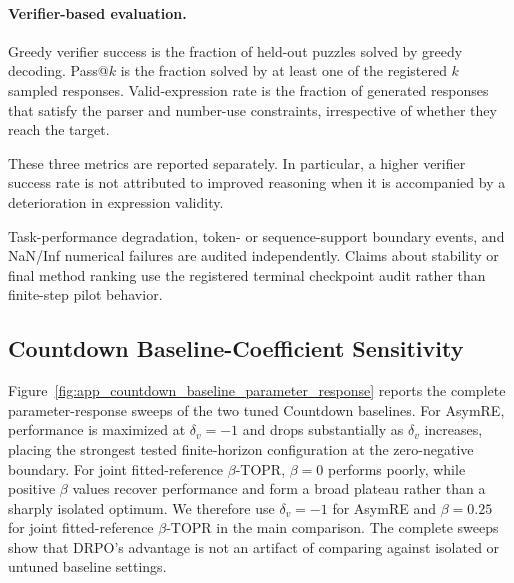 \documentclass{article}
\theoremstyle{plain}
\theoremstyle{definition}
\theoremstyle{remark}
\begin{document}
\paragraph{Verifier-based evaluation.}

Greedy verifier success is the fraction of held-out puzzles solved by
greedy decoding. Pass@$k$ is the fraction solved by at least one of
the registered \(k\) sampled responses. Valid-expression rate is the
fraction of generated responses that satisfy the parser and number-use
constraints, irrespective of whether they reach the target.

These three metrics are reported separately. In particular, a higher
verifier success rate is not attributed to improved reasoning when it
is accompanied by a deterioration in expression validity.

Task-performance degradation, token- or sequence-support boundary
events, and NaN/Inf numerical failures are audited independently.
Claims about stability or final method ranking use the registered
terminal checkpoint audit rather than finite-step pilot behavior.


\subsection{Countdown Baseline-Coefficient Sensitivity}
\label{app:countdown_baseline_sensitivity}

Figure~\ref{fig:app_countdown_baseline_parameter_response} reports the
complete parameter-response sweeps of the two tuned Countdown baselines.
For AsymRE, performance is maximized at \(\delta_v=-1\) and drops
substantially as \(\delta_v\) increases, placing the strongest tested
finite-horizon configuration at the zero-negative boundary. For joint
fitted-reference \(\beta\)-TOPR, \(\beta=0\) performs poorly, while
positive \(\beta\) values recover performance and form a broad plateau
rather than a sharply isolated optimum. We therefore use
\(\delta_v=-1\) for AsymRE and \(\beta=0.25\) for joint
fitted-reference \(\beta\)-TOPR in the main comparison. The complete
sweeps show that DRPO's advantage is not an artifact of comparing
against isolated or untuned baseline settings.
\end{document}
